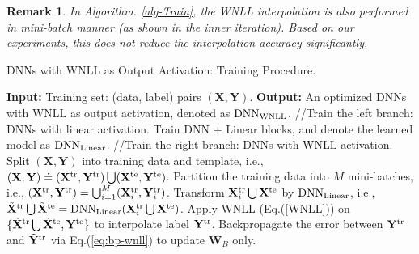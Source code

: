 \documentclass{article}
\newcommand\xmod[1]{{\textcolor{blue}{#1}}}
\newtheorem{remark}{Remark}
\begin{document}
\begin{remark}
In Algorithm. \ref{alg-Train}, the WNLL interpolation is also performed in mini-batch manner (as shown in the inner iteration). Based on our experiments, this does not reduce the interpolation accuracy significantly.
\end{remark}



\begin{algorithm}
\caption{DNNs with WNLL as Output Activation: Training Procedure.}\label{alg-Train}
\begin{algorithmic}
\State \textbf{Input: } Training set: (data, label) pairs $(\mathbf{X}, \mathbf{Y})$.
\State \textbf{Output: } An optimized DNNs with WNLL as output activation, denoted as ${\rm DNN}_{\rm WNLL}$.
\State //Train the left branch: DNNs with linear activation.
\State Train DNN $+$ Linear blocks, and denote the learned model as ${\rm DNN}_{\rm Linear}$.
\State //Train the right branch: DNNs with WNLL activation.
\State Split $(\mathbf{X}, \mathbf{Y})$ into training data and template, i.e., $(\mathbf{X}, \mathbf{Y}) \doteq (\mathbf{X}^{\rm tr}, \mathbf{Y}^{\rm tr}) \bigcup (\mathbf{X}^{\rm te}, \mathbf{Y}^{\rm te})$.
\State Partition the training data into $M$ mini-batches, i.e., $(\mathbf{X}^{\rm tr}, \mathbf{Y}^{\rm tr}) = \bigcup_{i=1}^M (\mathbf{X}_i^{\rm tr}, \mathbf{Y}_i^{\rm tr})$.
\State Transform $\mathbf{X}_i^{\rm tr}\bigcup \mathbf{X}^{\rm te}$ by ${\rm DNN}_{\rm Linear}$, i.e.,  $\tilde{\mathbf{X}}^{\rm tr} \bigcup \tilde{\mathbf{X}}^{\rm te} = {\rm DNN}_{\rm Linear}(\mathbf{X}_i^{\rm tr}\bigcup \mathbf{X}^{\rm te})$.
\State Apply WNLL (Eq.(\ref{WNLL})) on $\{\tilde{\mathbf{X}}^{\rm tr} \bigcup \tilde{\mathbf{X}}^{\rm te}, \mathbf{Y}^{\rm te}\}$ to interpolate label $\tilde{\mathbf{Y}}^{\rm tr}$.
\State Backpropagate the error between $\mathbf{Y}^{\rm tr}$ and $\tilde{\mathbf{Y}}^{\rm tr}$ via Eq.(\ref{eq:bp-wnll}) to update $\mathbf{W}_B$ only.
\EndFor
\EndFor
\end{algorithmic}
\end{algorithm}
\end{document}
